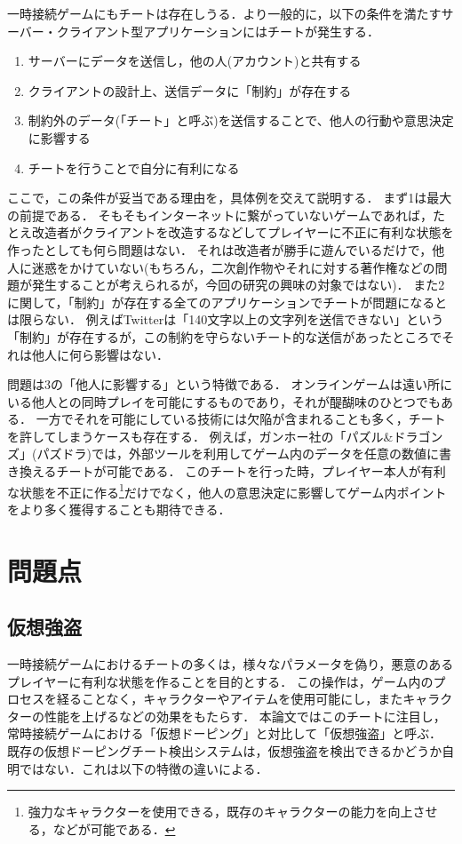 \documentclass[a4paper,11pt]{jsarticle}
\begin{document}
一時接続ゲームにもチートは存在しうる．より一般的に，以下の条件を満たすサーバー・クライアント型アプリケーションにはチートが発生する．

\begin{enumerate}
\item
サーバーにデータを送信し，他の人(アカウント)と共有する
\item
クライアントの設計上、送信データに「制約」が存在する
\item
制約外のデータ(「チート」と呼ぶ)を送信することで、他人の行動や意思決定に影響する
\item
チートを行うことで自分に有利になる
\end{enumerate}

ここで，この条件が妥当である理由を，具体例を交えて説明する．
まず1は最大の前提である．
そもそもインターネットに繋がっていないゲームであれば，たとえ改造者がクライアントを改造するなどしてプレイヤーに不正に有利な状態を作ったとしても何ら問題はない．
それは改造者が勝手に遊んでいるだけで，他人に迷惑をかけていない(もちろん，二次創作物やそれに対する著作権などの問題が発生することが考えられるが，今回の研究の興味の対象ではない)．
また2に関して，「制約」が存在する全てのアプリケーションでチートが問題になるとは限らない．
例えばTwitterは「140文字以上の文字列を送信できない」という「制約」が存在するが，この制約を守らないチート的な送信があったところでそれは他人に何ら影響はない．

問題は3の「他人に影響する」という特徴である．
オンラインゲームは遠い所にいる他人との同時プレイを可能にするものであり，それが醍醐味のひとつでもある．
一方でそれを可能にしている技術には欠陥が含まれることも多く，チートを許してしまうケースも存在する．
例えば，ガンホー社の「パズル\&ドラゴンズ」(パズドラ)では，外部ツール\cite{ghostrouter}を利用してゲーム内のデータを任意の数値に書き換えるチートが可能である．
このチートを行った時，プレイヤー本人が有利な状態を不正に作る\footnote{強力なキャラクターを使用できる，既存のキャラクターの能力を向上させる，などが可能である．}だけでなく，他人の意思決定に影響してゲーム内ポイントをより多く獲得することも期待できる．

\section{問題点}
\subsection{仮想強盗}
一時接続ゲームにおけるチートの多くは，様々なパラメータを偽り，悪意のあるプレイヤーに有利な状態を作ることを目的とする．
この操作は，ゲーム内のプロセスを経ることなく，キャラクターやアイテムを使用可能にし，またキャラクターの性能を上げるなどの効果をもたらす．
本論文ではこのチートに注目し，常時接続ゲームにおける「仮想ドーピング」と対比して「仮想強盗」と呼ぶ．
既存の仮想ドーピングチート検出システムは，仮想強盗を検出できるかどうか自明ではない．これは以下の特徴の違いによる．
\end{document}
